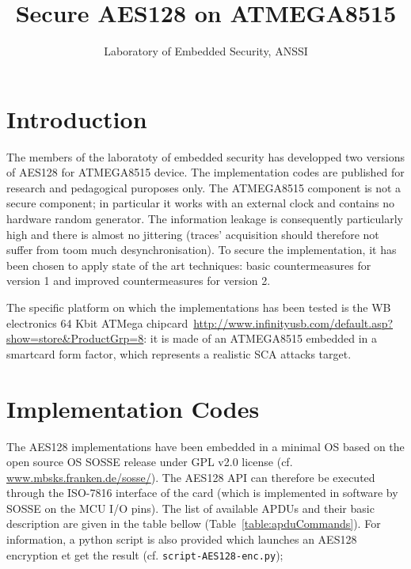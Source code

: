 \documentclass{article}
\title{Secure AES128 on ATMEGA8515}
\author{Laboratory of Embedded Security, ANSSI}
\begin{document}
\pagestyle{plain}
\maketitle
\section{Introduction}

The members of the laboratoty of embedded security has developped two versions of AES128 for ATMEGA8515 device. The implementation codes are published for research and pedagogical puroposes only. The ATMEGA8515 component is not a secure component; in particular it works with an external clock and contains no hardware random generator. The information leakage is consequently particularly high and there is almost no jittering (traces' acquisition should therefore not suffer from toom much desynchronisation). To secure the implementation, it has been chosen to apply state of the art techniques: basic countermeasures for version 1 and improved countermeasures for version 2.

The specific platform on which the implementations has been tested is the WB electronics 64 Kbit ATMega chipcard~\url{http://www.infinityusb.com/default.asp?show=store&ProductGrp=8}: it is made of an ATMEGA8515 embedded in a smartcard form factor, which represents a realistic SCA attacks target.

\section{Implementation Codes}

The AES128 implementations have been embedded in a minimal OS based on the open source OS SOSSE release under GPL v2.0 license (cf. \url{www.mbsks.franken.de/sosse/}). The AES128 API can therefore be executed through the ISO-7816 interface of the card (which is implemented in software by SOSSE on the MCU I/O pins). The list of available APDUs and their basic description are given in the table bellow (Table~\ref{table:apduCommands}). For information, a python script is also provided which launches an AES128 encryption et get the result (cf. \texttt{script-AES128-enc.py});
\end{document}
